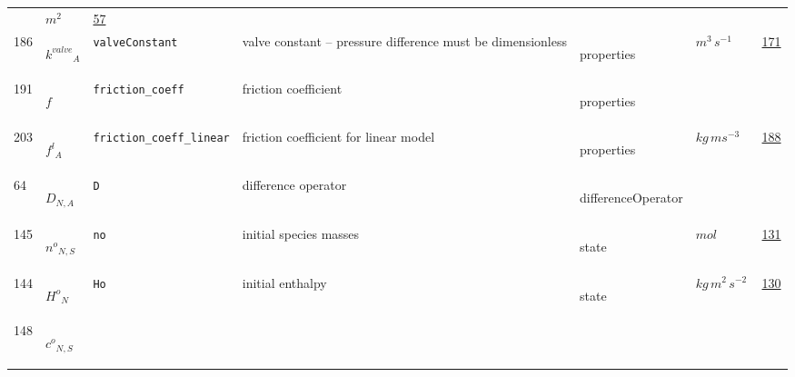 \begin{longtable}{|p{1cm}|p{2.5cm}|p{4.5cm}|p{8cm}|p{3.0cm}|p{3cm}|p{1cm}|}
             & $ m^{2} \, $
             &                 \hyperlink{"e:57"}{ 57 }
                 \\
            186
             & \hypertarget{"v:186"}{ $ {{k^{valve}}}{_{A}} $}
             & \verb|valveConstant|
             & valve constant -- pressure difference must be dimensionless
             & \begin{lay}properties \end{lay}
             & $ m^{3} \,s^{-1} \, $
             &                 \hyperlink{"e:171"}{ 171 }
                 \\
            191
             & \hypertarget{"v:191"}{ $ {{f}}{_{}} $}
             & \verb|friction_coeff|
             & friction coefficient
             & \begin{lay}properties \end{lay}
             & $  $
             & \\
            203
             & \hypertarget{"v:203"}{ $ {{f^l}}{_{A}} $}
             & \verb|friction_coeff_linear|
             & friction coefficient for linear model
             & \begin{lay}properties \end{lay}
             & $ kg \,m s^{-3} \, $
             &                 \hyperlink{"e:188"}{ 188 }
                 \\
            64
             & \hypertarget{"v:64"}{ $ {D}{_{N, A}} $}
             & \verb|D|
             & difference operator
             & \begin{lay}differenceOperator \end{lay}
             & $  $
             & \\
            145
             & \hypertarget{"v:145"}{ $ {{n^o}}{_{N, S}} $}
             & \verb|no|
             & initial species masses
             & \begin{lay}state \end{lay}
             & $ mol \, $
             &                 \hyperlink{"e:131"}{ 131 }
                 \\
            144
             & \hypertarget{"v:144"}{ $ {{H^o}}{_{N}} $}
             & \verb|Ho|
             & initial enthalpy
             & \begin{lay}state \end{lay}
             & $ kg \,m^{2} \,s^{-2} \, $
             &                 \hyperlink{"e:130"}{ 130 }
                 \\
            148
             & \hypertarget{"v:148"}{ $ {{c^o}}{_{N, S}} $}

\end{longtable}
